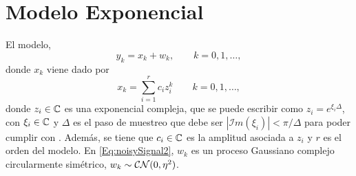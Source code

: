     \section{Modelo Exponencial}\label{sec:ModelDescription}

		El modelo,
		\begin{equation}
			y_k = x_k + w_k,\qquad k=0,1,\ldots,
			\label{Eq:noisySignal2}
		\end{equation}
		donde $x_k$ viene dado por
		\begin{equation}
			x_k = \sum_{i=1}^{r}c_iz_i^k  \qquad k = 0,1,\ldots, 
			\label{Eq:Eq:NoiselessSignal}
		\end{equation}
		donde $z_i\in\mathbb{C}$ es una exponencial compleja, que se puede escribir como $z_i = e^{\xi_i\Delta}$, con $\xi_i\in\mathbb{C}$ y $\Delta$ es el paso de muestreo que debe ser $|\mathcal{I}m(\xi_i)|<\pi/\Delta$ para poder cumplir con \cite{Nyquist1928}. Además, se tiene que $c_i\in\mathbb{C}$ es la amplitud asociada a $z_i$ y $r$ es el orden del modelo. En \eqref{Eq:noisySignal2}, $w_k$ es un proceso Gaussiano complejo circularmente simétrico, $w_k\sim\mathcal{CN}(0,\eta^2)$. 
  

